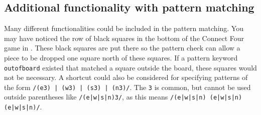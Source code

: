 \subsection{Additional functionality with pattern matching}
Many different functionalities could be included in the pattern matching. You
may have noticed the row of black squares in the bottom of the Connect Four game
in . These black squares are put there so the
pattern check can allow a piece to be dropped one square north of these squares.
If a pattern keyword \texttt{outofboard} existed that matched a square outside
the board, these squares would not be necessary. A shortcut could also be
considered for specifying patterns of the form \texttt{/(e3) | (w3) | (s3) |
(n3)/}. The \texttt{3} is common, but cannot be used outside parentheses like
\texttt{/(e|w|s|n)3/}, as this means \texttt{/(e|w|s|n) (e|w|s|n) (e|w|s|n)/}.
